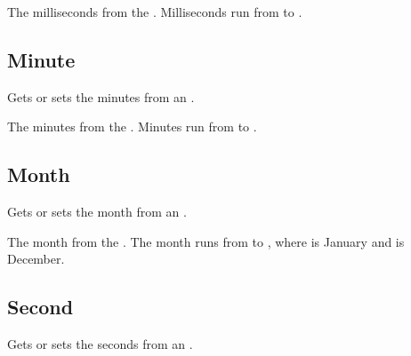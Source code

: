 \documentclass[letterpaper,12pt,english,openany,oneside]{sphinxmanual}
\begin{document}

The milliseconds from the . Milliseconds run from  to .




\subsection{Minute}
\label{\detokenize{IAC_API_OLE_Objects:minute}}
Gets or sets the minutes from an .


\begin{sphinxVerbatim}[commandchars=\\\{\}]
\PYG{p}{[}\PYG{p}{]} 
\end{sphinxVerbatim}


The minutes from the . Minutes run from  to .




\subsection{Month}
\label{\detokenize{IAC_API_OLE_Objects:month}}
Gets or sets the month from an .


\begin{sphinxVerbatim}[commandchars=\\\{\}]
\PYG{p}{[}\PYG{p}{]} 
\end{sphinxVerbatim}


The month from the . The month runs from  to , where  is January and  is December.




\subsection{Second}
\label{\detokenize{IAC_API_OLE_Objects:second}}
Gets or sets the seconds from an .
\end{document}
